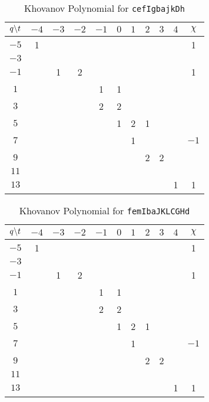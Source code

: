 \documentclass{article}
\theoremstyle{plain}
\begin{document}
        \begin{table}[H]
            \centering
            \begin{tabular}{| c | c | c | c | c | c | c | c | c | c | c |}
                \hline
                $q\symbol{92}t$&$-4$&$-3$&$-2$&$-1$&$0$&$1$&$2$&$3$&$4$&$\chi$\\
                \hline
                $-5$&1&&&&&&&&&1\\
                \hline
                $-3$&&&&&&&&&&\\
                \hline
                $-1$&&1&2&&&&&&&1\\
                \hline
                $1$&&&&1&1&&&&&\\
                \hline
                $3$&&&&2&2&&&&&\\
                \hline
                $5$&&&&&1&2&1&&&\\
                \hline
                $7$&&&&&&1&&&&$-1$\\
                \hline
                $9$&&&&&&&2&2&&\\
                \hline
                $11$&&&&&&&&&&\\
                \hline
                $13$&&&&&&&&&1&1\\
                \hline
            \end{tabular}
            \caption{Khovanov Polynomial for \texttt{cefIgbajkDh}}
            \label{table:cefIgbajkDh_kho}
        \end{table}
        \begin{table}[H]
            \centering
            \begin{tabular}{| c | c | c | c | c | c | c | c | c | c | c |}
                \hline
                $q\symbol{92}t$&$-4$&$-3$&$-2$&$-1$&$0$&$1$&$2$&$3$&$4$&$\chi$\\
                \hline
                $-5$&1&&&&&&&&&1\\
                \hline
                $-3$&&&&&&&&&&\\
                \hline
                $-1$&&1&2&&&&&&&1\\
                \hline
                $1$&&&&1&1&&&&&\\
                \hline
                $3$&&&&2&2&&&&&\\
                \hline
                $5$&&&&&1&2&1&&&\\
                \hline
                $7$&&&&&&1&&&&$-1$\\
                \hline
                $9$&&&&&&&2&2&&\\
                \hline
                $11$&&&&&&&&&&\\
                \hline
                $13$&&&&&&&&&1&1\\
                \hline
            \end{tabular}
            \caption{Khovanov Polynomial for \texttt{femIbaJKLCGHd}}
            \label{table:femIbaJKLCGHd_kho}
        \end{table}
\end{document}
